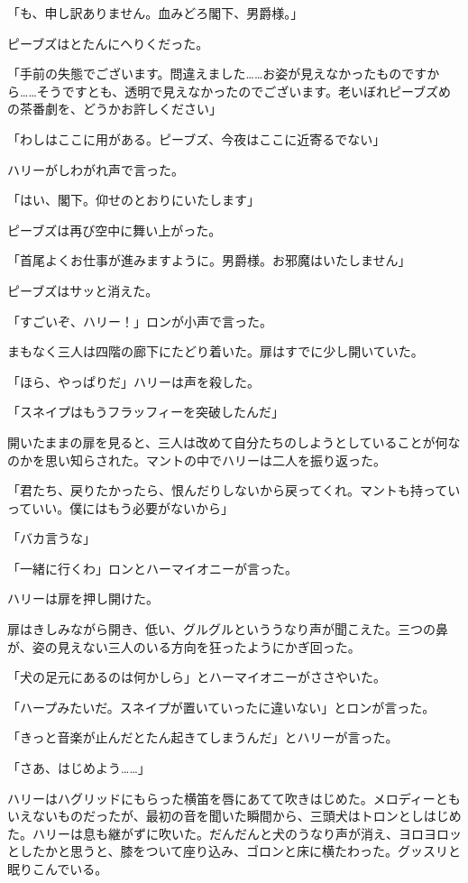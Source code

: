 \documentclass[10pt,a4paper]{article}
\begin{document}
\begin{CJK}{UTF8}{min}
「も、申し訳ありません。血みどろ閣下、男爵様。」

ピーブズはとたんにへりくだった。

「手前の失態でございます。問違えました……お姿が見えなかったものですから……そうですとも、透明で見えなかったのでございます。老いぼれピーブズめの茶番劇を、どうかお許しください」

「わしはここに用がある。ピーブズ、今夜はここに近寄るでない」

ハリーがしわがれ声で言った。

「はい、閣下。仰せのとおりにいたします」

ピーブズは再び空中に舞い上がった。

「首尾よくお仕事が進みますように。男爵様。お邪魔はいたしません」

ピーブズはサッと消えた。

「すごいぞ、ハリー！」ロンが小声で言った。

まもなく三人は四階の廊下にたどり着いた。扉はすでに少し開いていた。

「ほら、やっぱりだ」ハリーは声を殺した。

「スネイプはもうフラッフィーを突破したんだ」

開いたままの扉を見ると、三人は改めて自分たちのしようとしていることが何なのかを思い知らされた。マントの中でハリーは二人を振り返った。

「君たち、戻りたかったら、恨んだりしないから戻ってくれ。マントも持っていっていい。僕にはもう必要がないから」

「バカ言うな」

「一緒に行くわ」ロンとハーマイオニーが言った。

ハリーは扉を押し開けた。

扉はきしみながら開き、低い、グルグルといううなり声が聞こえた。三つの鼻が、姿の見えない三人のいる方向を狂ったようにかぎ回った。

「犬の足元にあるのは何かしら」とハーマイオニーがささやいた。

「ハープみたいだ。スネイプが置いていったに違いない」とロンが言った。

「きっと音楽が止んだとたん起きてしまうんだ」とハリーが言った。

「さあ、はじめよう……」

ハリーはハグリッドにもらった横笛を唇にあてて吹きはじめた。メロディーともいえないものだったが、最初の音を聞いた瞬間から、三頭犬はトロンとしはじめた。ハリーは息も継がずに吹いた。だんだんと犬のうなり声が消え、ヨロヨロッとしたかと思うと、膝をついて座り込み、ゴロンと床に横たわった。グッスリと眠りこんでいる。


\end{CJK}
\end{document}
